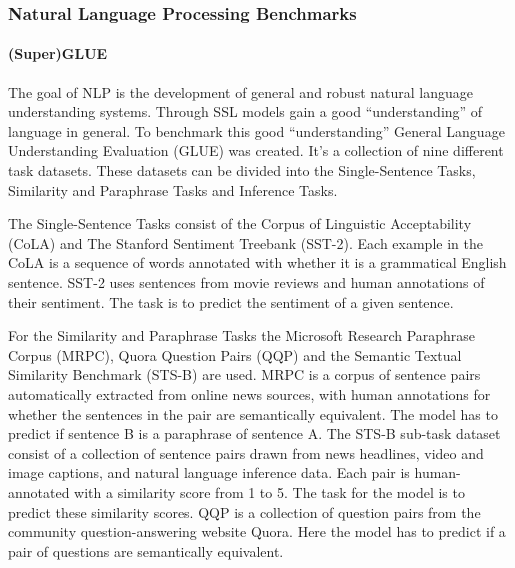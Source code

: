 \documentclass[
]{krantz}
\begin{document}
\hypertarget{natural-language-processing-benchmarks}{%
\subsubsection{Natural Language Processing Benchmarks}\label{natural-language-processing-benchmarks}}

\hypertarget{superglue}{%
\paragraph{(Super)GLUE}\label{superglue}}

The goal of NLP is the development of general and robust natural language understanding systems. Through SSL models gain a good ``understanding'' of language in general. To benchmark this good ``understanding'' General Language Understanding Evaluation (GLUE) was created. It's a collection of nine different task datasets. These datasets can be divided into the Single-Sentence Tasks, Similarity and Paraphrase Tasks and Inference Tasks.

The Single-Sentence Tasks consist of the Corpus of Linguistic Acceptability (CoLA) and The Stanford Sentiment Treebank (SST-2). Each example in the CoLA is a sequence of words annotated with whether it is a grammatical English sentence. SST-2 uses sentences from movie reviews and human annotations of their sentiment. The task is to predict the sentiment of a given sentence.

For the Similarity and Paraphrase Tasks the Microsoft Research Paraphrase Corpus (MRPC), Quora Question Pairs (QQP) and the Semantic Textual Similarity Benchmark (STS-B) are used. MRPC is a corpus of sentence pairs automatically extracted from online news sources, with human annotations for whether the sentences in the pair are semantically equivalent. The model has to predict if sentence B is a paraphrase of sentence A. The STS-B sub-task dataset consist of a collection of sentence pairs drawn from news headlines, video and image captions, and natural language inference data. Each pair is human-annotated with a similarity score from 1 to 5. The task for the model is to predict these similarity scores. QQP is a collection of question pairs from the community question-answering website Quora. Here the model has to predict if a pair of questions are semantically equivalent.
\end{document}
